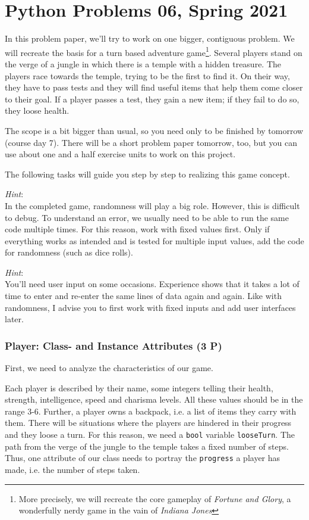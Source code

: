 \documentclass[
	english,
	fontsize=10pt,
	parskip=half,
	titlepage=true,
	DIV=12
]{scrartcl}
\newcommand*{\inPy}[1]{\texttt{#1}}
\newcommand*{\ie}{i.\;e. }
\begin{document}
\part*{Python Problems 06, Spring 2021}
In this problem paper, we'll try to work on one bigger, contiguous problem. We will recreate the basis for a turn based adventure game\footnote{More precisely, we will recreate the core gameplay of \emph{Fortune and Glory}, a wonderfully nerdy game in the vain of \emph{Indiana Jones}}. Several players stand on the verge of a jungle in which there is a temple with a hidden treasure. The players race towards the temple, trying to be the first to find it. On their way, they have to pass tests and they will find useful items that help them come closer to their goal. If a player passes a test, they gain a new item; if they fail to do so, they loose health.

The scope is a bit bigger than usual, so you need only to be finished by tomorrow (course day 7). There will be a short problem paper tomorrow, too, but you can use about one and a half exercise units to work on this project.

The following tasks will guide you step by step to realizing this game concept.

\emph{Hint}:\\
In the completed game, randomness will play a big role. However, this is difficult to debug. To understand an error, we usually need to be able to run the same code multiple times. For this reason, work with fixed values first. Only if everything works as intended and is tested for multiple input values, add the code for randomness (such as dice rolls).

\emph{Hint}:\\
You'll need user input on some occasions. Experience shows that it takes a lot of time to enter and re-enter the same lines of data again and again. Like with randomness, I advise you to first work with fixed inputs and add user interfaces later.

\section{Player: Class- and Instance Attributes (3 P)}
First, we need to analyze the characteristics of our game.

Each player is described by their name, some integers telling their health, strength, intelligence, speed and charisma levels. All these values should be in the range 3-6. Further, a player owns a backpack, \ie a list of items they carry with them. There will be situations where the players are hindered in their progress and they loose a turn. For this reason, we need a \inPy{bool} variable \texttt{looseTurn}. The path from the verge of the jungle to the temple takes a fixed number of steps. Thus, one attribute of our class needs to portray the \texttt{progress} a player has made, \ie the number of steps taken.
\end{document}
